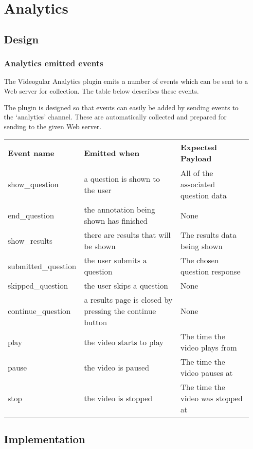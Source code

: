 \chapter{Analytics} \label{Chapter: Analytics}

\section{Design}

\subsection{Analytics emitted events}

The Videogular Analytics plugin emits a number of events which can be sent to a Web server for collection. The table below describes these events.

The plugin is designed so that events can easily be added by sending events to the `analytics' channel. These are automatically collected and prepared for sending to the given Web server.

\begin{tabular}{p{3.2cm} p{7cm} p{4cm}}

\textbf{Event name} & \textbf{Emitted when} & \textbf{Expected Payload} \\
\hline 
show\_question & a question is shown to the user & All of the associated question data \\
\hline 
end\_question & the annotation being shown has finished & None \\
\hline 
show\_results & there are results that will be shown & The results data being shown \\
\hline 
submitted\_question & the user submits a question & The chosen question response \\
\hline 
skipped\_question & the user skips a question & None \\
\hline 
continue\_question & a results page is closed by pressing the continue button & None \\
\hline 
play & the video starts to play & The time the video plays from \\
\hline 
pause & the video is paused & The time the video pauses at \\
\hline 
stop & the video is stopped & The time the video was stopped at \\
\end{tabular}

\section{Implementation}

